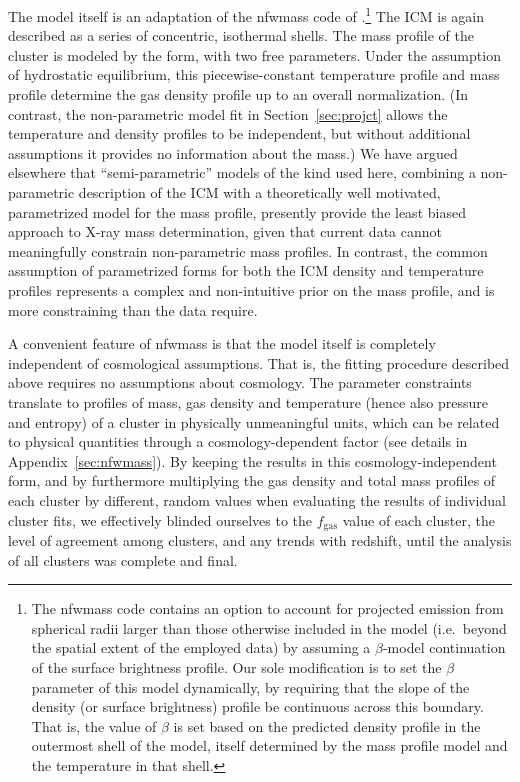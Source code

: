 \documentclass[useAMS,usenatbib,usegraphicx]{mn2e}
\newcommand*{\mysub}[2]{\ensuremath{#1_{\mathrm{#2}}}}
\newcommand*{\fgas}{\mysub{f}{gas}}
\newcommand*{\secref}{Section}
\newcommand*{\appref}{Appendix}
\newcommand*{\NFW}{\citetalias{Navarro9611107}}
\begin{document}
The model itself is an adaptation of the {\sc nfwmass} code of \citet[][distributed as part of the {\sc clmass} package for {\sc xspec}; see also \appref~\ref{sec:nfwmass}]{Nulsen1008.2393}.\footnote{The {\sc nfwmass} code contains an option to account for projected emission from spherical radii larger than those otherwise included in the model (i.e.\ beyond the spatial extent of the employed data) by assuming a $\beta$-model continuation of the surface brightness profile. Our sole modification is to set the $\beta$ parameter of this model dynamically, by requiring that the slope of the density (or surface brightness) profile be continuous across this boundary. That is, the value of $\beta$ is set based on the predicted density profile in the outermost shell of the model, itself determined by the mass profile model and the temperature in that shell.} The ICM is again described as a series of concentric, isothermal shells. The mass profile of the cluster is modeled by the \NFW{} form, with two free parameters. Under the assumption of hydrostatic equilibrium, this piecewise-constant temperature profile and \NFW{} mass profile determine the gas density profile up to an overall normalization. (In contrast, the non-parametric model fit in \secref~\ref{sec:projct} allows the temperature and density profiles to be independent, but  without additional assumptions it provides no information about the mass.) We have argued elsewhere \citep{Mantz1106.4052} that ``semi-parametric'' models of the kind used here, combining a non-parametric description of the ICM with a theoretically well motivated, parametrized model for the mass profile, presently provide the least biased approach to X-ray mass determination, given that current data cannot meaningfully constrain non-parametric mass profiles. In contrast, the common assumption of parametrized forms for both the ICM density and temperature profiles represents a complex and non-intuitive prior on the mass profile, and is more constraining than the data require.

A convenient feature of {\sc nfwmass} is that the model itself is completely independent of cosmological assumptions. That is, the fitting procedure described above requires no assumptions about cosmology. The parameter constraints translate to profiles of mass, gas density and temperature (hence also pressure and entropy) of a cluster in physically unmeaningful units, which can be related to physical quantities through a cosmology-dependent factor (see details in \appref~\ref{sec:nfwmass}). By keeping the results in this cosmology-independent form, and by furthermore multiplying the gas density and total mass profiles of each cluster by different, random values when evaluating the results of individual cluster fits, we effectively blinded ourselves to the \fgas{} value of each cluster, the level of agreement among clusters, and any trends with redshift, until the analysis of all clusters was complete and final.
\end{document}
